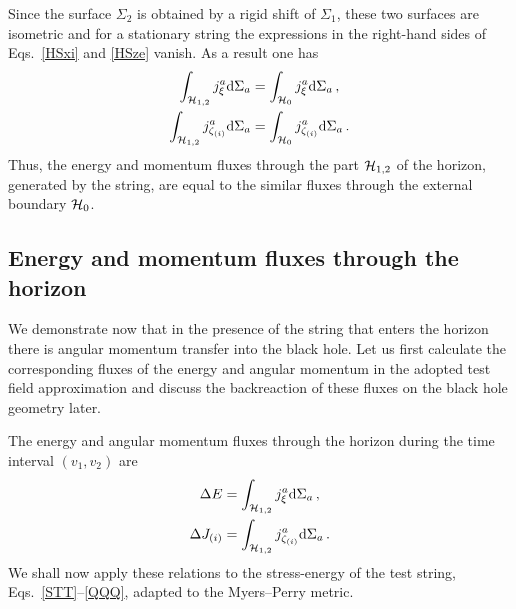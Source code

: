 \documentclass[superscriptaddress,twocolumn,showpacs,
preprintnumbers,amsmath,amssymb,nofootinbib,
longbibliography,aps,prd,10pt]{revtex4-1}
\newcommand{\dd}{\mbox{d}}
\newcommand{\n}[1]{\label{#1}}
\begin{document}
Since the surface $\Sigma_2$ is obtained by a rigid shift of $\Sigma_1$, these two surfaces are isometric and for a stationary string the expressions in the right-hand sides of Eqs.~\eqref{HSxi} and \eqref{HSze} vanish. As a result one has
\begin{align}
\int_{ {\cal H}_{1,2}} j_{\xi}^a \dd\Sigma_a &= \int_{ {\cal H}_0}j_{\xi}^a \dd\Sigma_a\, ,\\
\int_{ {\cal H}_{1,2}} j_{\zeta_{(i)}}^a \dd\Sigma_a &= \int_{ {\cal H}_0} j_{\zeta_{(i)}}^a \dd\Sigma_a\, .
\end{align}
Thus, the energy and momentum fluxes through the part ${\cal H}_{1,2}$ of the horizon, generated by the string, are equal to the similar fluxes through the external boundary ${\cal H}_0$. 

\subsection{Energy and momentum fluxes through the horizon}

We demonstrate now that in the presence of the string that enters the horizon there is angular momentum transfer into the black hole. Let us first calculate the corresponding fluxes of the energy and angular momentum in the adopted test field approximation and discuss the backreaction of these fluxes on the black hole geometry later.

The energy and angular momentum fluxes through the horizon during the time interval $(v_1,v_2)$ are
\begin{align}
\Delta E&=\int_{{\cal H}_{1,2}} j_{\xi}^a \dd\Sigma_a\, ,\n{EEE}\\
\Delta J_{(i)}&=\int_{{\cal H}_{1,2}} j_{\zeta_{(i)}}^a \dd\Sigma_a\,.\n{JJJ}
\end{align}
We shall now apply these relations to the stress-energy of the test string, Eqs.~\eqref{STT}--\eqref{QQQ}, adapted to the Myers--Perry metric.
\end{document}
